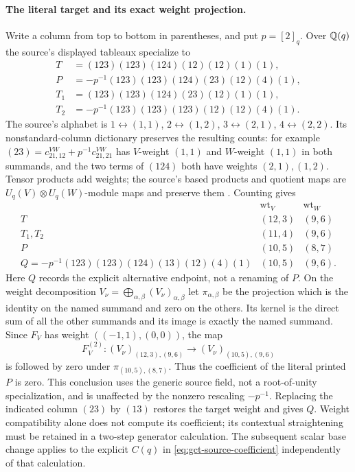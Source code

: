 \paragraph{The literal target and its exact weight projection.}
Write a column from top to bottom in parentheses, and put $p=[2]_q$.
Over $\mathbb{Q}(q)$ the source's displayed tableaux specialize to
\[
\begin{aligned}
 T&=(123)(123)(124)(12)(12)(1)(1),\\
 P&=-p^{-1}(123)(123)(124)(23)(12)(4)(1),\\
 T_1&=(123)(123)(124)(23)(12)(1)(1),\\
 T_2&=-p^{-1}(123)(123)(123)(12)(12)(4)(1).
\end{aligned}
\]
The source's alphabet is
$1\leftrightarrow(1,1)$, $2\leftrightarrow(1,2)$,
$3\leftrightarrow(2,1)$, $4\leftrightarrow(2,2)$.
Its nonstandard-column dictionary preserves the resulting counts:
for example $(23)=c^{VW}_{21,12}+p^{-1}c^{VW}_{21,21}$
has $V$-weight $(1,1)$ and $W$-weight $(1,1)$ in both summands,
and the two terms of $(124)$ both have weights $(2,1),(1,2)$.
Tensor products add weights; the source's based products and quotient
maps are $U_q(V)\otimes U_q(W)$-module maps and preserve them
\cite[nonstandard-column dictionary and Proposition labelled
``p NSC facts'']{blasiakMulmuleySohoni2013}. Counting gives
\[
\begin{array}{c|cc}
 &\operatorname{wt}_V&\operatorname{wt}_W\\\hline
 T&(12,3)&(9,6)\\
 T_1,T_2&(11,4)&(9,6)\\
 P&(10,5)&(8,7)\\
 Q=-p^{-1}(123)(123)(124)(13)(12)(4)(1)&(10,5)&(9,6).
\end{array}
\]
Here $Q$ records the explicit alternative endpoint, not a renaming
of $P$. On the weight decomposition $V_\nu=\bigoplus_{\alpha,\beta}
(V_\nu)_{\alpha,\beta}$ let $\pi_{\alpha,\beta}$ be the projection
which is the identity on the named summand and zero on the others.
Its kernel is the direct sum of all the other summands and its image
is exactly the named summand. Since $F_V$ has weight
$((-1,1),(0,0))$, the map
\[
 F_V^{(2)}:(V_\nu)_{(12,3),(9,6)}
       \longrightarrow(V_\nu)_{(10,5),(9,6)}
\]
is followed by zero under $\pi_{(10,5),(8,7)}$.
Thus the coefficient of the literal printed $P$ is zero.
This conclusion uses the generic source field, not a root-of-unity
specialization, and is unaffected by the nonzero rescaling $-p^{-1}$.
Replacing the indicated column $(23)$ by $(13)$ restores the target
weight and gives $Q$. Weight compatibility alone does not compute
its coefficient; its contextual straightening must be retained in
a two-step generator calculation. The subsequent scalar base change
applies to the explicit $C(q)$ in \eqref{eq:gct-source-coefficient}
independently of that calculation.


